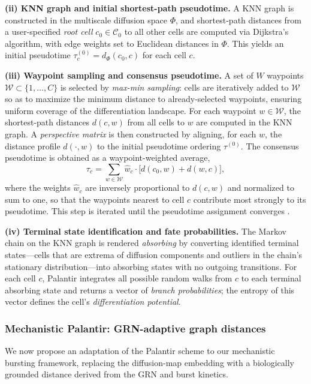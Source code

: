 \documentclass[10pt]{article}
\begin{document}
\textbf{(ii) KNN graph and initial shortest-path pseudotime.}
A KNN graph is constructed in the multiscale diffusion space $\Phi$, and
shortest-path distances from a user-specified \emph{root cell} $c_0 \in \mathcal{C}_0$
to all other cells are computed via Dijkstra's algorithm, with edge weights set to
Euclidean distances in $\Phi$.  This yields an initial pseudotime
$\tau^{(0)}_c = d_{\Phi}(c_0, c)$ for each cell $c$.

\textbf{(iii) Waypoint sampling and consensus pseudotime.}
A set of $W$ waypoints $\mathcal{W} \subset \{1,\dots,C\}$ is selected by
\emph{max-min sampling}: cells are iteratively added to $\mathcal{W}$ so as to
maximize the minimum distance to already-selected waypoints, ensuring uniform
coverage of the differentiation landscape.  For each waypoint $w \in \mathcal{W}$,
the shortest-path distances $d(c,w)$ from all cells to $w$ are computed in the KNN
graph.  A \emph{perspective matrix} is then constructed by aligning, for each $w$,
the distance profile $d(\cdot,w)$ to the initial pseudotime ordering $\tau^{(0)}$.
The consensus pseudotime is obtained as a waypoint-weighted average,
\[
    \tau_c = \sum_{w \in \mathcal{W}} \hat{w}_c \cdot \bigl[d(c_0, w) + d(w, c)\bigr],
\]
where the weights $\hat{w}_c$ are inversely proportional to $d(c,w)$ and normalized
to sum to one, so that the waypoints nearest to cell $c$ contribute most strongly to
its pseudotime.  This step is iterated until the pseudotime assignment converges
\cite{Setty2019}.

\textbf{(iv) Terminal state identification and fate probabilities.}
The Markov chain on the KNN graph is rendered \emph{absorbing} by converting
identified terminal states---cells that are extrema of diffusion components and
outliers in the chain's stationary distribution---into absorbing states with no
outgoing transitions.  For each cell $c$, Palantir integrates all possible random
walks from $c$ to each terminal absorbing state and returns a vector of
\emph{branch probabilities}; the entropy of this vector defines the cell's
\emph{differentiation potential}.

\subsubsection{Mechanistic Palantir: GRN-adaptive graph distances}
\label{sec:mech-palantir}

We now propose an adaptation of the Palantir scheme to our mechanistic bursting
framework, replacing the diffusion-map embedding with a biologically grounded
distance derived from the GRN and burst kinetics.
\end{document}
